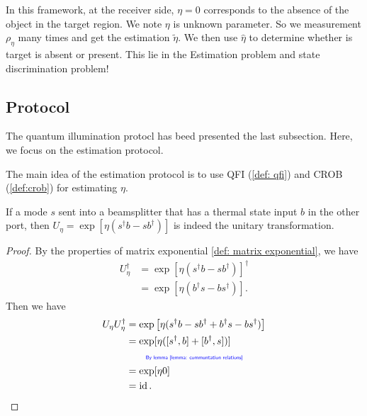 \documentclass[../../note.tex]{subfiles}
\begin{document}
In this framework, at the receiver side, $\eta=0$ corresponds to the absence of the object in the target region. We note $\eta$ is unknown parameter. So we measurement $\rho_{\eta}$ many times and get the estimation $\tilde{\eta}$. We then use $\hat{\eta}$ to determine whether is target is absent or present. This lie in the Estimation problem and state discrimination problem!

\subsection{Protocol}
The quantum illumination protocl has beed presented the last subsection. Here, we focus on the estimation protocol.

The main idea of the estimation protocol is to use QFI (\ref{def: qfi}) and CROB (\ref{def:crob}) for estimating $\eta$.

\begin{lemma}
    If a mode $s$ sent into a beamsplitter that has a thermal state input $b$ in the other port, then $U_{\eta} = \exp[\eta(s^\dagger b - s b^\dagger)]$ is indeed the unitary transformation.
\end{lemma}
\begin{proof}
    By the properties of matrix exponential \ref{def: matrix exponential}, we have
    \begin{align}
        U_{\eta}^{\dagger}
        &= \exp[\eta(s^\dagger b - s b^\dagger)]^\dagger \\
        &= \exp[\eta(b^\dagger s - b s^\dagger)].
    \end{align}
    Then we have
    \begin{align}
        U_{\eta} U_{\eta}^\dagger
        &= \exp\left[\eta(s^\dagger b - s b^\dagger + b^\dagger s - b s^\dagger)\right] \\
        &= \exp[\eta([s^\dagger, b] + [b^\dagger, s])] \\
        &\qquad\text{\color{blue}{\tiny\sffamily By lemma \ref{lemma: communtation relations}}} \nonumber \\
        &= \exp[\eta 0] \\
        &= \operatorname{id}.
    \end{align}
\end{proof}
\end{document}
